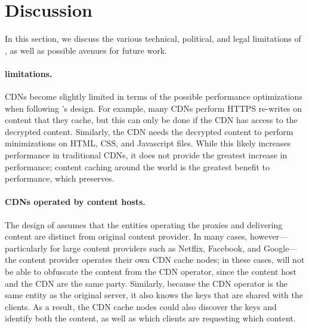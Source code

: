 \section{Discussion}
\label{sec:discussion}

In this section, we discuss the various technical, political, and legal limitations
of \system{}, as well as possible avenues for future work. 

\paragraph{\system{} limitations.} CDNs become slightly limited in terms of the 
possible performance optimizations when following \system{}'s design.  For example, 
many CDNs perform HTTPS re-writes on content that they cache, but this can only be 
done if the CDN has access to the decrypted content.  Similarly, the CDN needs the 
decrypted content to perform minimizations on HTML, CSS, and Javascript files.  While 
this likely increases performance in traditional CDNs, it does not provide the greatest 
increase in performance; content caching around the world is the greatest benefit to 
performance, which \system{} preserves.

\paragraph{CDNs operated by content hosts.} The design of \system{}
assumes that the entities operating the proxies and delivering content are
distinct from original content provider. In many cases, however---particularly
for large content providers such as Netflix, Facebook, and Google---the
content provider operates their own CDN cache nodes; in these cases, \system{} will
not be able to obfuscate the content from the CDN operator, since the content host
and the CDN are the same party.  Similarly, because the CDN operator is the same
entity as the original server, it also knows the keys that are shared with the clients.
As a result, the CDN cache nodes could also discover the keys and identify both
the content, as well as which clients are requesting which content.


